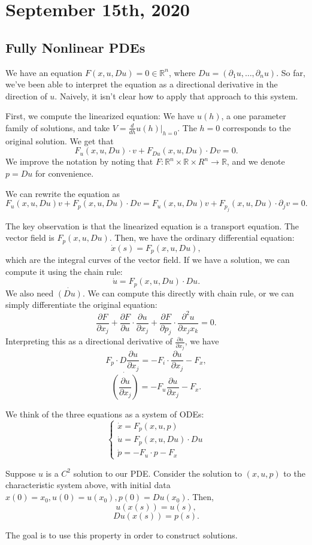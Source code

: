 \documentclass[12pt]{scrartcl}
\newcommand{\R}{\mathbb{R}}
\begin{document}
\section{September 15th, 2020}
\subsection{Fully Nonlinear PDEs}
We have an equation $F(x, u, Du) = 0 \in \R^n$, where $Du = (\partial_1 u, \dots, \partial_n u)$.  So far, we've been able to interpret the equation as a directional derivative in the direction of $u$.  Naively, it isn't clear how to apply that approach to this system.

First, we compute the linearized equation: We have $u(h)$, a one parameter family of solutions, and take $V = \frac{d}{dh}u(h)\vert_{h = 0}.$  The $h = 0$ corresponds to the original solution.  We get that $$F_u(x, u, Du) \cdot v + F_{Du}(x, u, Du) \cdot Dv = 0.$$
We improve the notation by noting that $F: \R^n \times \R \times R^n \rightarrow \R$, and we denote $p = Du$ for convenience.  

We can rewrite the equation as 
$$F_u(x, u, Du)v + F_p(x, u, Du) \cdot Dv = F_u(x, u, Du)v + F_{p_j}(x, u, Du) \cdot \partial_j v = 0.$$

The key observation is that the linearized equation is a transport equation.  The vector field is $F_p(x, u, Du)$.  Then, we have the ordinary differential equation:
$$\dot{x}(s) = F_p(x, u, Du),$$
which are the integral curves of the vector field.  If we have a solution, we can compute it using the chain rule:
$$\dot u = F_p(x, u, Du) \cdot Du.$$
We also need $\dot{(Du)}$.  We can compute this directly with chain rule, or we can simply differentiate the original equation:
$$\frac{\partial F}{\partial x_j} + \frac{\partial F}{\partial u} \cdot \frac{\partial u}{\partial x_j} + \frac{\partial F}{\partial p_j}\cdot \frac{\partial^2 u}{\partial x_jx_k} = 0.$$
Interpreting this as a directional derivative of $\frac{\partial u}{\partial x_j}$, we have 
$$F_p \cdot D \frac{\partial u}{\partial x_j} = -F_i \cdot \frac{\partial u}{\partial x_j} - F_x,$$
$$\dot{\left (\frac{\partial u}{\partial x_j}\right )} = -F_u \frac{\partial u}{\partial x_j} - F_x.$$

We think of the three equations as a system of ODEs:
$$\begin{cases}
\dot{x} = F_p(x, u, p)\\
\dot u = F_p(x, u, Du) \cdot Du\\
\dot p = - F_u \cdot p - F_x
\end{cases}
$$
\begin{lemma} Suppose $u$ is a $C^2$ solution to our PDE.  Consider the solution to $(x, u, p)$ to the characteristic system above, with initial data $x(0) = x_0, u(0) = u(x_0), p(0) = Du(x_0)$.  Then, $$u(x(s)) = u(s),$$
$$Du(x(s)) = p(s).$$
\end{lemma}
The goal is to use this property in order to construct solutions.  
\end{document}
